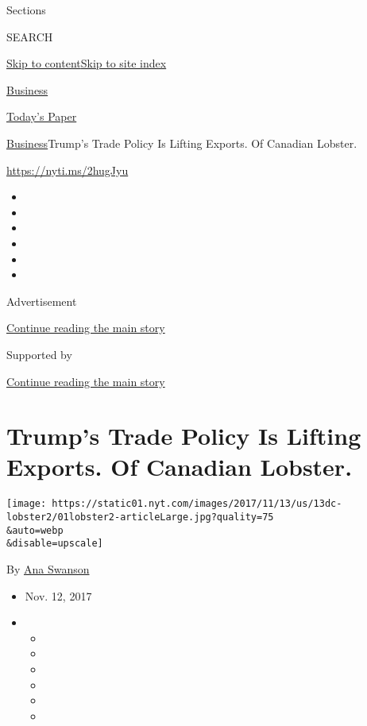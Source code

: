 Sections

SEARCH

\protect\hyperlink{site-content}{Skip to
content}\protect\hyperlink{site-index}{Skip to site index}

\href{https://www.nytimes.com/section/business}{Business}

\href{https://myaccount.nytimes.com/auth/login?response_type=cookie\&client_id=vi}{}

\href{https://www.nytimes.com/section/todayspaper}{Today's Paper}

\href{/section/business}{Business}\textbar{}Trump's Trade Policy Is
Lifting Exports. Of Canadian Lobster.

\url{https://nyti.ms/2hugJyu}

\begin{itemize}
\item
\item
\item
\item
\item
\item
\end{itemize}

Advertisement

\protect\hyperlink{after-top}{Continue reading the main story}

Supported by

\protect\hyperlink{after-sponsor}{Continue reading the main story}

\hypertarget{trumps-trade-policy-is-lifting-exports-of-canadian-lobster}{%
\section{Trump's Trade Policy Is Lifting Exports. Of Canadian
Lobster.}\label{trumps-trade-policy-is-lifting-exports-of-canadian-lobster}}

\texttt{[image: https://static01.nyt.com/images/2017/11/13/us/13dc-lobster2/01lobster2-articleLarge.jpg?quality=75\\\&auto=webp\\\&disable=upscale]}

By \href{https://www.nytimes.com/by/ana-swanson}{Ana Swanson}

\begin{itemize}
\item
  Nov. 12, 2017
\item
  \begin{itemize}
  \item
  \item
  \item
  \item
  \item
  \item
  \end{itemize}
\end{itemize}

